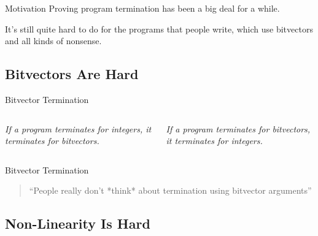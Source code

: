 \documentclass[xcolor=pdftex,t,11pt]{beamer}
\newcommand{\xmark}{\ding{55}}
\begin{document}
\begin{frame}{Motivation}
Proving program termination has been a big deal for a while.

\vspace{1em}

It's still quite hard to do for the programs that people write, which use bitvectors and all kinds of nonsense.
\end{frame}


\subsection{Bitvectors Are Hard}

\begin{frame}[fragile]{Bitvector Termination}
 \begin{columns}[c]
  \emph{If a program terminates for integers, it terminates for bitvectors.}

  \uncover<2->{{\centering \color{red} \Huge \xmark
  
  }
  
  
  }

  \emph{If a program terminates for bitvectors, it terminates for integers.}

  \uncover<3->{{\centering \color{red} \Huge \xmark
  
  }
  
  
  }
 \end{columns}

 \vspace{1.5em}
 
 
\end{frame}


\begin{frame}{Bitvector Termination}
\begin{quote}
 ``People really don't *think* about termination using bitvector arguments''
   \hspace*{}
\end{quote}
\end{frame}


\subsection{Non-Linearity Is Hard}
\end{document}

